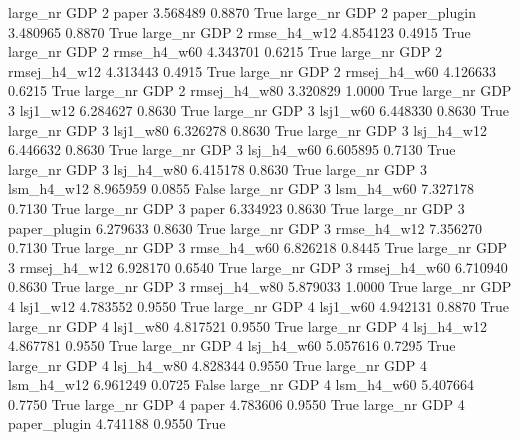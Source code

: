   large_nr      GDP                 2        paper    3.568489      0.8870    True
  large_nr      GDP                 2 paper_plugin    3.480965      0.8870    True
  large_nr      GDP                 2  rmse_h4_w12    4.854123      0.4915    True
  large_nr      GDP                 2  rmse_h4_w60    4.343701      0.6215    True
  large_nr      GDP                 2 rmsej_h4_w12    4.313443      0.4915    True
  large_nr      GDP                 2 rmsej_h4_w60    4.126633      0.6215    True
  large_nr      GDP                 2 rmsej_h4_w80    3.320829      1.0000    True
  large_nr      GDP                 3     lsj1_w12    6.284627      0.8630    True
  large_nr      GDP                 3     lsj1_w60    6.448330      0.8630    True
  large_nr      GDP                 3     lsj1_w80    6.326278      0.8630    True
  large_nr      GDP                 3   lsj_h4_w12    6.446632      0.8630    True
  large_nr      GDP                 3   lsj_h4_w60    6.605895      0.7130    True
  large_nr      GDP                 3   lsj_h4_w80    6.415178      0.8630    True
  large_nr      GDP                 3   lsm_h4_w12    8.965959      0.0855   False
  large_nr      GDP                 3   lsm_h4_w60    7.327178      0.7130    True
  large_nr      GDP                 3        paper    6.334923      0.8630    True
  large_nr      GDP                 3 paper_plugin    6.279633      0.8630    True
  large_nr      GDP                 3  rmse_h4_w12    7.356270      0.7130    True
  large_nr      GDP                 3  rmse_h4_w60    6.826218      0.8445    True
  large_nr      GDP                 3 rmsej_h4_w12    6.928170      0.6540    True
  large_nr      GDP                 3 rmsej_h4_w60    6.710940      0.8630    True
  large_nr      GDP                 3 rmsej_h4_w80    5.879033      1.0000    True
  large_nr      GDP                 4     lsj1_w12    4.783552      0.9550    True
  large_nr      GDP                 4     lsj1_w60    4.942131      0.8870    True
  large_nr      GDP                 4     lsj1_w80    4.817521      0.9550    True
  large_nr      GDP                 4   lsj_h4_w12    4.867781      0.9550    True
  large_nr      GDP                 4   lsj_h4_w60    5.057616      0.7295    True
  large_nr      GDP                 4   lsj_h4_w80    4.828344      0.9550    True
  large_nr      GDP                 4   lsm_h4_w12    6.961249      0.0725   False
  large_nr      GDP                 4   lsm_h4_w60    5.407664      0.7750    True
  large_nr      GDP                 4        paper    4.783606      0.9550    True
  large_nr      GDP                 4 paper_plugin    4.741188      0.9550    True
